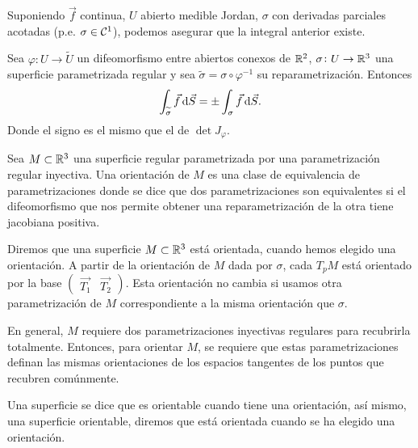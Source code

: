 \begin{obs*}
    Suponiendo $\vec{f}$ continua, $U$ abierto medible Jordan, $\sigma$ con derivadas parciales acotadas (p.e. $\sigma \in \mathcal{C}^1$),
    podemos asegurar que la integral anterior existe.
\end{obs*}

\begin{lema}
    Sea $\varphi \colon U \to \widetilde{U}$ un difeomorfismo entre abiertos conexos de $\mathbb{R}^2$, $\sigma \colon U \to \mathbb{R}^3$ una superficie
    parametrizada regular y sea $\widetilde{\sigma} = \sigma \circ \varphi^{-1}$ su reparametrización. Entonces
    \[
        \int_{\widetilde{\sigma}} \vec{f} \dif \vec{S} = \pm \int_\sigma \vec{f} \dif \vec{S}.
    \]
    Donde el signo es el mismo que el de $\det J_\varphi$.
\end{lema}

\begin{defi}
    Sea $M \subset \mathbb{R}^3$ una superficie regular parametrizada por una parametrización regular inyectiva. Una orientación de $M$ es una
    clase de equivalencia de parametrizaciones donde se dice que dos parametrizaciones son equivalentes si el difeomorfismo que nos permite
    obtener una reparametrización de la otra tiene jacobiana positiva.
\end{defi}

\begin{defi}
    Diremos que una superficie $M \subset \mathbb{R}^3$ está orientada, cuando hemos elegido una orientación. A partir de la orientación de $M$ dada
    por $\sigma$, cada $T_pM$ está orientado por la base $\begin{pmatrix} \vec{T_1} & \vec{T_2} \end{pmatrix}$. Esta orientación no cambia si
    usamos otra parametrización de $M$ correspondiente a la misma orientación que $\sigma$.
\end{defi}

\begin{obs}
    En general, $M$ requiere dos parametrizaciones inyectivas regulares para recubrirla totalmente. Entonces, para orientar $M$, se requiere que
    estas parametrizaciones definan las mismas orientaciones de los espacios tangentes de los puntos que recubren comúnmente.
\end{obs}

\begin{defi}
    Una superficie se dice que es orientable cuando tiene una orientación, así mismo, una superficie orientable, diremos que está
    orientada cuando se ha elegido una orientación.
\end{defi}

